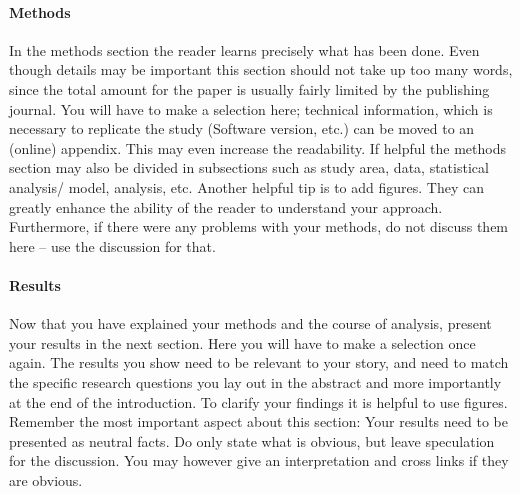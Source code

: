\documentclass{tufte-book}
\begin{document}
\paragraph{Methods}
In the methods section %
the reader learns precisely what has been done. Even though details may be important this section should not take up too many words, since the total amount for the paper is usually fairly limited by the publishing journal. You will have to make a selection here; technical information, which is necessary to replicate the study (Software version, etc.) can be moved to an (online) appendix. This may even increase the readability. If helpful the methods section may also be divided in subsections such as study area, data, statistical analysis/ model, analysis, etc. Another helpful tip is to add figures. They can greatly enhance the ability of the reader to understand your approach. Furthermore, if there were any problems with your methods, do not discuss them here -- use the discussion for that.\\

\paragraph{Results}
Now that you have explained your methods and the course of analysis, present your results in the next section.%
Here you will have to make a selection once again. The results you show need to be relevant to your story, and need to match the specific research questions you lay out in the abstract and more importantly at the end of the introduction. To clarify your findings it is helpful to use figures.
Remember the most important aspect about this section: Your results need to be presented as neutral facts. Do only state what is obvious, but leave speculation for the discussion. You may however give an interpretation and cross links if they are obvious.\\

\end{document}
